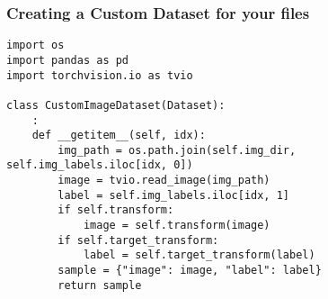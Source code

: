 \begin{frame}[fragile]
\frametitle{Creating a Custom Dataset for your files}

\begin{lstlisting}
import os
import pandas as pd
import torchvision.io as tvio

class CustomImageDataset(Dataset):
    :
    def __getitem__(self, idx):
        img_path = os.path.join(self.img_dir, self.img_labels.iloc[idx, 0])
        image = tvio.read_image(img_path)
        label = self.img_labels.iloc[idx, 1]
        if self.transform:
            image = self.transform(image)
        if self.target_transform:
            label = self.target_transform(label)
        sample = {"image": image, "label": label}
        return sample
\end{lstlisting}

\end{frame} 








